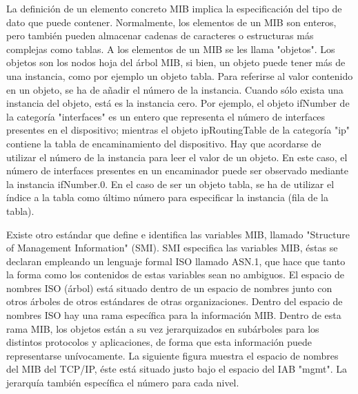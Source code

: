 \noindent 
La definición de un elemento concreto MIB implica la especificación del tipo de dato que puede contener. Normalmente, los elementos de un MIB son enteros, pero también pueden almacenar cadenas de caracteres o estructuras más complejas como tablas. A los elementos de un MIB se les llama "objetos". Los objetos son los nodos hoja del árbol MIB, si bien, un objeto puede tener más de una instancia, como por ejemplo un objeto tabla. Para referirse al valor contenido en un objeto, se ha de añadir el número de la instancia. Cuando sólo exista una instancia del objeto, está es la instancia cero.
\noindent
Por ejemplo, el objeto ifNumber de la categoría "interfaces" es un entero que representa el número de interfaces presentes en el dispositivo; mientras el objeto ipRoutingTable de la categoría "ip" contiene la tabla de encaminamiento del dispositivo.
\noindent
Hay que acordarse de utilizar el número de la instancia para leer el valor de un objeto. En este caso, el número de interfaces presentes en un encaminador puede ser observado mediante la instancia ifNumber.0.
\noindent
En el caso de ser un objeto tabla, se ha de utilizar el índice a la tabla como último número para especificar la instancia (fila de la tabla).

\noindent
\newline
Existe otro estándar que define e identifica las variables MIB, llamado "Structure of Management Information" (SMI). SMI especifica las variables MIB, éstas se declaran empleando un lenguaje formal ISO llamado ASN.1, que hace que tanto la forma como los contenidos de estas variables sean no ambiguos.
\noindent
El espacio de nombres ISO (árbol) está situado dentro de un espacio de nombres junto con otros árboles de otros estándares de otras organizaciones. Dentro del espacio de nombres ISO hay una rama específica para la información MIB. Dentro de esta rama MIB, los objetos están a su vez jerarquizados en subárboles para los distintos protocolos y aplicaciones, de forma que esta información puede representarse unívocamente.
\noindent
La siguiente figura muestra el espacio de nombres del MIB del TCP/IP, éste está situado justo bajo el espacio del IAB "mgmt". La jerarquía también específica el número para cada nivel.

